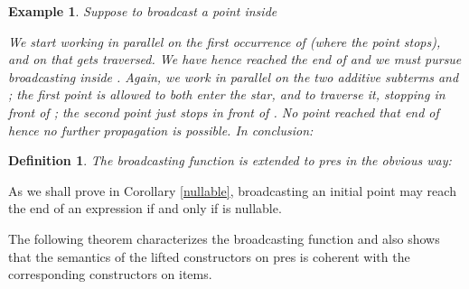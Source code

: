 \documentclass[preprint]{sigplanconf}
\newcounter{item}
\newtheorem{definition}[item]{Definition}
\newtheorem{example}[item]{Example}
\begin{document}
\begin{example}
Suppose to broadcast a point inside 

We start working in parallel on the first 
occurrence of  (where the point stops), and on  that
gets traversed. We have hence reached the end of  and
we must pursue broadcasting inside . Again, we work
in parallel on the two additive subterms  and ; the first
point is allowed to both enter the star, and to traverse it,
stopping in front of ; the second point just stops in front of
. No point reached that end of  hence no further 
propagation is possible.
In conclusion:

\end{example}

\begin{definition} The broadcasting function is extended to pres 
in the obvious way:

\end{definition}

\noindent
As we shall prove in Corollary \ref{nullable}, broadcasting an initial 
point may reach the end of an expression  if and only if  
is nullable.



\noindent



\noindent
The following theorem characterizes the broadcasting function and also
shows that the semantics of the lifted constructors on
pres is coherent with the corresponding constructors on items.
\end{document}
